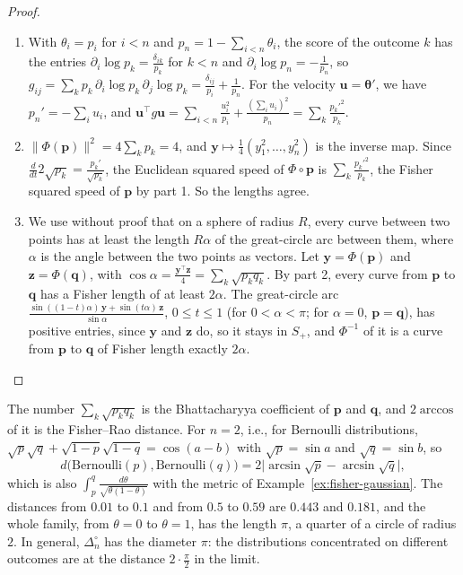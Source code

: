 \documentclass[11pt]{article}
\newcommand{\norm}[1]{\lVert #1 \rVert}
\theoremstyle{definition}
\theoremstyle{plain}
\theoremstyle{remark}
\begin{document}
\begin{proof}
    \begin{enumerate}
        \item With $\theta_i = p_i$ for $i < n$ and $p_n = 1 - \sum_{i<n}\theta_i$, the score of the outcome $k$ has the entries $\partial_i\log p_k = \frac{\delta_{ik}}{p_k}$ for $k < n$ and $\partial_i\log p_n = -\frac{1}{p_n}$, so $g_{ij} = \sum_k p_k\,\partial_i\log p_k\,\partial_j\log p_k = \frac{\delta_{ij}}{p_i} + \frac{1}{p_n}$. For the velocity $\mathbf{u} = \boldsymbol{\theta}'$, we have $p_n' = -\sum_i u_i$, and $\mathbf{u}^\top g\mathbf{u} = \sum_{i<n}\frac{u_i^2}{p_i} + \frac{(\sum_i u_i)^2}{p_n} = \sum_k \frac{p_k'^2}{p_k}$.
        \item $\norm{\Phi(\mathbf{p})}^2 = 4\sum_k p_k = 4$, and $\mathbf{y} \mapsto \frac{1}{4}(y_1^2, \ldots, y_n^2)$ is the inverse map. Since $\frac{d}{dt}2\sqrt{p_k} = \frac{p_k'}{\sqrt{p_k}}$, the Euclidean squared speed of $\Phi \circ \mathbf{p}$ is $\sum_k \frac{p_k'^2}{p_k}$, the Fisher squared speed of $\mathbf{p}$ by part 1. So the lengths agree.
        \item We use without proof that on a sphere of radius $R$, every curve between two points has at least the length $R\alpha$ of the great-circle arc between them, where $\alpha$ is the angle between the two points as vectors. Let $\mathbf{y} = \Phi(\mathbf{p})$ and $\mathbf{z} = \Phi(\mathbf{q})$, with $\cos\alpha = \frac{\mathbf{y}^\top\mathbf{z}}{4} = \sum_k\sqrt{p_kq_k}$. By part 2, every curve from $\mathbf{p}$ to $\mathbf{q}$ has a Fisher length of at least $2\alpha$. The great-circle arc $\frac{\sin((1 - t)\alpha)\,\mathbf{y} + \sin(t\alpha)\,\mathbf{z}}{\sin\alpha}$, $0 \leq t \leq 1$ (for $0 < \alpha < \pi$; for $\alpha = 0$, $\mathbf{p} = \mathbf{q}$), has positive entries, since $\mathbf{y}$ and $\mathbf{z}$ do, so it stays in $S_+$, and $\Phi^{-1}$ of it is a curve from $\mathbf{p}$ to $\mathbf{q}$ of Fisher length exactly $2\alpha$. \qedhere
    \end{enumerate}
\end{proof}

The number $\sum_k \sqrt{p_kq_k}$ is the Bhattacharyya coefficient of $\mathbf{p}$ and $\mathbf{q}$, and $2\arccos$ of it is the Fisher--Rao distance. For $n = 2$, i.e., for Bernoulli distributions, $\sqrt{p}\sqrt{q} + \sqrt{1 - p}\sqrt{1 - q} = \cos(a - b)$ with $\sqrt{p} = \sin a$ and $\sqrt{q} = \sin b$, so
\[d\big(\text{Bernoulli}(p), \text{Bernoulli}(q)\big) = 2\big|\arcsin\sqrt{p} - \arcsin\sqrt{q}\big|,\]
which is also $\int_p^q \frac{d\theta}{\sqrt{\theta(1 - \theta)}}$ with the metric of Example~\ref{ex:fisher-gaussian}. The distances from $0.01$ to $0.1$ and from $0.5$ to $0.59$ are $0.443$ and $0.181$, and the whole family, from $\theta = 0$ to $\theta = 1$, has the length $\pi$, a quarter of a circle of radius $2$. In general, $\Delta_n^\circ$ has the diameter $\pi$: the distributions concentrated on different outcomes are at the distance $2 \cdot \frac{\pi}{2}$ in the limit.
\end{document}
